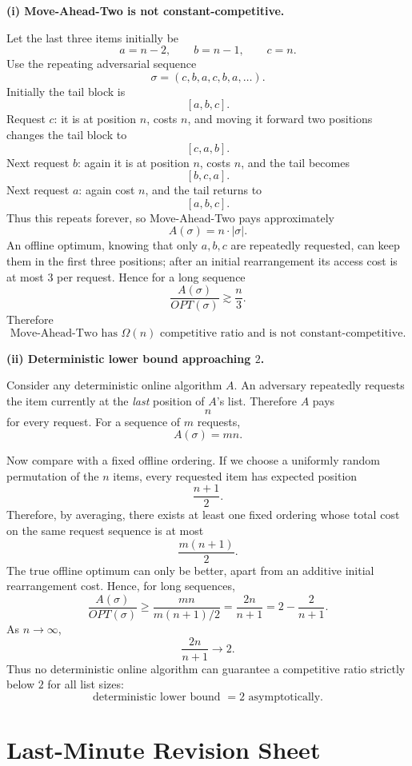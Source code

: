 \documentclass[10.5pt,a4paper]{article}
\begin{document}
\begin{answerbox}
\textbf{(i) Move-Ahead-Two is not constant-competitive.}

Let the last three items initially be
\[
a=n-2,\qquad b=n-1,\qquad c=n.
\]
Use the repeating adversarial sequence
\[
\sigma=(c,b,a,c,b,a,\ldots).
\]
Initially the tail block is
\[
[a,b,c].
\]
Request $c$: it is at position $n$, costs $n$, and moving it forward two positions changes the tail block to
\[
[c,a,b].
\]
Next request $b$: again it is at position $n$, costs $n$, and the tail becomes
\[
[b,c,a].
\]
Next request $a$: again cost $n$, and the tail returns to
\[
[a,b,c].
\]
Thus this repeats forever, so Move-Ahead-Two pays approximately
\[
A(\sigma)=n\cdot |\sigma|.
\]
An offline optimum, knowing that only $a,b,c$ are repeatedly requested, can keep them in the first three positions; after an initial rearrangement its access cost is at most $3$ per request. Hence for a long sequence
\[
\frac{A(\sigma)}{OPT(\sigma)}\gtrsim\frac n3.
\]
Therefore
\[
\boxed{\text{Move-Ahead-Two has }\Omega(n)\text{ competitive ratio and is not constant-competitive}.}
\]

\medskip
\textbf{(ii) Deterministic lower bound approaching $2$.}

Consider any deterministic online algorithm $A$. An adversary repeatedly requests the item currently at the \emph{last} position of $A$'s list. Therefore $A$ pays
\[
n
\]
for every request. For a sequence of $m$ requests,
\[
A(\sigma)=mn.
\]

Now compare with a fixed offline ordering. If we choose a uniformly random permutation of the $n$ items, every requested item has expected position
\[
\frac{n+1}{2}.
\]
Therefore, by averaging, there exists at least one fixed ordering whose total cost on the same request sequence is at most
\[
\frac{m(n+1)}2.
\]
The true offline optimum can only be better, apart from an additive initial rearrangement cost. Hence, for long sequences,
\[
\frac{A(\sigma)}{OPT(\sigma)}
\ge
\frac{mn}{m(n+1)/2}
=
\frac{2n}{n+1}
=2-\frac{2}{n+1}.
\]
As $n\to\infty$,
\[
\frac{2n}{n+1}\to2.
\]
Thus no deterministic online algorithm can guarantee a competitive ratio strictly below $2$ for all list sizes:
\[
\boxed{\text{deterministic lower bound }=2\text{ asymptotically}.}
\]
\end{answerbox}

\newpage
\section*{Last-Minute Revision Sheet}
\end{document}
